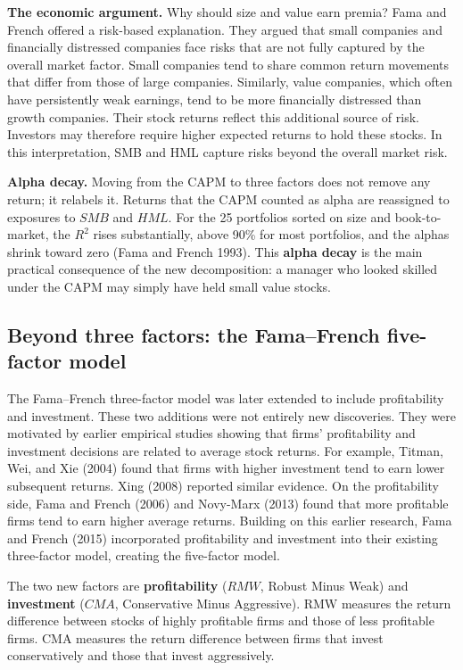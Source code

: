\textbf{The economic argument.} Why should size and value earn premia? 
Fama and French offered a risk-based explanation. They argued that small companies and financially distressed companies face risks that are not fully captured by the overall market factor. Small companies tend to share common return movements that differ from those of large companies. Similarly, value companies, which often have persistently weak earnings, tend to be more financially distressed than growth companies. Their stock returns reflect this additional source of risk. Investors may therefore require higher expected returns to hold these stocks. In this interpretation, SMB and HML capture risks beyond the overall market risk.

\textbf{Alpha decay.} Moving from the CAPM to three factors does not remove any return; it relabels it. Returns that the CAPM counted as alpha are reassigned to exposures to $SMB$ and $HML$. For the 25 portfolios sorted on size and book-to-market, the $R^2$ rises substantially, above 90\% for most portfolios, and the alphas shrink toward zero (Fama and French 1993). This \textbf{alpha decay} is the main practical consequence of the new decomposition: a manager who looked skilled under the CAPM may simply have held small value stocks.


\subsection{Beyond three factors: the Fama--French five-factor model}
\label{sec:03-multifactor}

The Fama--French three-factor model was later extended to include profitability and investment. These two additions were not entirely new
discoveries. They were motivated by earlier empirical studies showing that firms' profitability and investment decisions are related to
average stock returns. For example, Titman, Wei, and Xie (2004) found that firms with higher investment tend to earn lower subsequent
returns. Xing (2008) reported similar evidence. On the profitability side, Fama and French (2006) and Novy-Marx (2013) found that more
profitable firms tend to earn higher average returns. Building on this earlier research, Fama and French (2015) incorporated profitability
and investment into their existing three-factor model, creating the five-factor model.

The two new factors are \textbf{profitability}  ($RMW$, Robust Minus Weak) and
\textbf{investment} ($CMA$, Conservative Minus Aggressive). RMW measures the return difference between stocks of
highly profitable firms and those of less profitable firms. CMA measures the return difference between firms that invest conservatively
and those that invest aggressively. 

